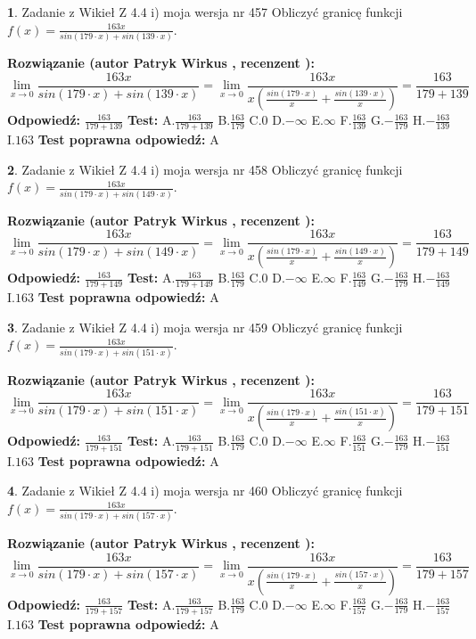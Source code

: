 \documentclass[12pt, a4paper]{article}
\theoremstyle{definition} %
\newtheorem{zad}{}
\newcommand{\zadStart}[1]{\begin{zad}#1\newline}
\newcommand{\zadStop}{\end{zad}}
\newcommand{\rozwStart}[2]{\noindent \textbf{Rozwiązanie (autor #1 , recenzent #2): }\newline}
\newcommand{\rozwStop}{\newline}
\newcommand{\odpStart}{\noindent \textbf{Odpowiedź:}\newline}
\newcommand{\odpStop}{\newline}
\newcommand{\testStart}{\noindent \textbf{Test:}\newline}
\newcommand{\testStop}{\newline}
\newcommand{\kluczStart}{\noindent \textbf{Test poprawna odpowiedź:}\newline}
\newcommand{\kluczStop}{\newline}
\begin{document}
\zadStart{Zadanie z Wikieł Z 4.4 i) moja wersja nr 457}
Obliczyć granicę funkcji $f(x)=\frac{163x}{sin(179\cdot x) +sin(139\cdot x)}$.
\zadStop
\rozwStart{Patryk Wirkus}{}
$$\lim\limits_{x\to 0}\frac{163x}{sin(179\cdot x) +sin(139\cdot x)}=\lim\limits_{x\to 0}\frac{163x}{x(\frac{sin(179\cdot x)}{x}+\frac{sin(139\cdot x)}{x})}=\frac{163}{179+139}$$
\rozwStop
\odpStart
$\frac{163}{179+139}$
\odpStop
\testStart
A.$\frac{163}{179+139}$
B.$\frac{163}{179}$
C.$0$
D.$-\infty$
E.$\infty$
F.$\frac{163}{139}$
G.$-\frac{163}{179}$
H.$-\frac{163}{139}$
I.$163$
\testStop
\kluczStart
A
\kluczStop



\zadStart{Zadanie z Wikieł Z 4.4 i) moja wersja nr 458}
Obliczyć granicę funkcji $f(x)=\frac{163x}{sin(179\cdot x) +sin(149\cdot x)}$.
\zadStop
\rozwStart{Patryk Wirkus}{}
$$\lim\limits_{x\to 0}\frac{163x}{sin(179\cdot x) +sin(149\cdot x)}=\lim\limits_{x\to 0}\frac{163x}{x(\frac{sin(179\cdot x)}{x}+\frac{sin(149\cdot x)}{x})}=\frac{163}{179+149}$$
\rozwStop
\odpStart
$\frac{163}{179+149}$
\odpStop
\testStart
A.$\frac{163}{179+149}$
B.$\frac{163}{179}$
C.$0$
D.$-\infty$
E.$\infty$
F.$\frac{163}{149}$
G.$-\frac{163}{179}$
H.$-\frac{163}{149}$
I.$163$
\testStop
\kluczStart
A
\kluczStop



\zadStart{Zadanie z Wikieł Z 4.4 i) moja wersja nr 459}
Obliczyć granicę funkcji $f(x)=\frac{163x}{sin(179\cdot x) +sin(151\cdot x)}$.
\zadStop
\rozwStart{Patryk Wirkus}{}
$$\lim\limits_{x\to 0}\frac{163x}{sin(179\cdot x) +sin(151\cdot x)}=\lim\limits_{x\to 0}\frac{163x}{x(\frac{sin(179\cdot x)}{x}+\frac{sin(151\cdot x)}{x})}=\frac{163}{179+151}$$
\rozwStop
\odpStart
$\frac{163}{179+151}$
\odpStop
\testStart
A.$\frac{163}{179+151}$
B.$\frac{163}{179}$
C.$0$
D.$-\infty$
E.$\infty$
F.$\frac{163}{151}$
G.$-\frac{163}{179}$
H.$-\frac{163}{151}$
I.$163$
\testStop
\kluczStart
A
\kluczStop



\zadStart{Zadanie z Wikieł Z 4.4 i) moja wersja nr 460}
Obliczyć granicę funkcji $f(x)=\frac{163x}{sin(179\cdot x) +sin(157\cdot x)}$.
\zadStop
\rozwStart{Patryk Wirkus}{}
$$\lim\limits_{x\to 0}\frac{163x}{sin(179\cdot x) +sin(157\cdot x)}=\lim\limits_{x\to 0}\frac{163x}{x(\frac{sin(179\cdot x)}{x}+\frac{sin(157\cdot x)}{x})}=\frac{163}{179+157}$$
\rozwStop
\odpStart
$\frac{163}{179+157}$
\odpStop
\testStart
A.$\frac{163}{179+157}$
B.$\frac{163}{179}$
C.$0$
D.$-\infty$
E.$\infty$
F.$\frac{163}{157}$
G.$-\frac{163}{179}$
H.$-\frac{163}{157}$
I.$163$
\testStop
\kluczStart
A
\kluczStop
\end{document}
